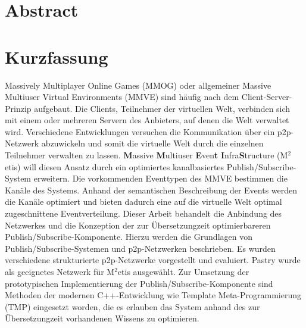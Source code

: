 \chapter*{Abstract}



\clearpage{\pagestyle{empty}\cleardoublepage}
\chapter*{Kurzfassung}
Massively Multiplayer Online Games (MMOG) oder allgemeiner Massive Multiuser Virtual Environments (MMVE) sind häufig nach dem Client-Server-Prinzip aufgebaut. Die Clients, Teilnehmer der virtuellen Welt, verbinden sich mit einem oder mehreren Servern des Anbieters, auf denen die Welt verwaltet wird. Verschiedene Entwicklungen versuchen die Kommunikation über ein p2p-Netzwerk abzuwickeln und somit die virtuelle Welt durch die einzelnen Teilnehmer verwalten zu lassen. \textbf{M}assive \textbf{M}ultiuser \textbf{E}ven\textbf{t} \textbf{I}nfra\textbf{S}tructure (M$^2$etis) will diesen Ansatz durch ein optimiertes kanalbasiertes Publish/Subscribe-System erweitern. Die vorkommenden Eventtypen des MMVE bestimmen die Kanäle des Systems. Anhand der semantischen Beschreibung der Events werden die Kanäle optimiert und bieten dadurch eine auf die virtuelle Welt optimal zugeschnittene Eventverteilung. Dieser Arbeit behandelt die Anbindung des Netzwerkes und die Konzeption der zur Übersetzungzeit optimierbareren Publish/Subscribe-Komponente. Hierzu werden die Grundlagen von Publish/Subscribe-Systemen und p2p-Netzwerken beschrieben. Es wurden verschiedene strukturierte p2p-Netzwerke vorgestellt und evaluiert. Pastry wurde als geeignetes Netzwerk für M$^2$etis ausgewählt. Zur Umsetzung der prototypischen Implementierung der Publish/Subscribe-Komponente sind Methoden der modernen C++-Entwicklung wie Template Meta-Programmierung (TMP) eingesetzt worden, die es erlauben das System anhand des zur Übersetzungzeit vorhandenen Wissens zu optimieren.

